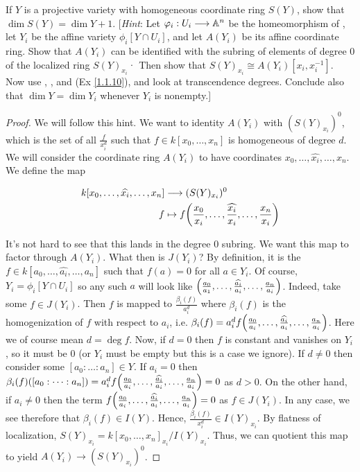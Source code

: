 \label{1.2.6}

If $Y$ is a projective variety with homogeneous coordinate ring $S(Y)$, show that
$\dim S(Y) = \dim Y + 1$. [\textit{Hint}: Let $\varphi_i: U_i \longrightarrow \mathbb A^n$ be the homeomorphism of \cite[2.2]{hartshorne},
let $Y_i$ be the affine variety $\phi_i[Y \cap U_i]$, and let $A(Y_i)$ be its affine coordinate ring. Show that $A(Y_i)$ can be identified with the subring of elements of degree $0$ of the
localized ring $S(Y)_{x_i}$· Then show that $S(Y)_{x_i} \cong A(Y_i)[x_i, x_i^{-1}]$. Now use \cite[1.7]{hartshorne},
\cite[1.8A]{hartshorne}, and (Ex \ref{1.1.10}), and look at transcendence degrees. Conclude also that $\dim Y = \dim Y_i$ whenever $Y_i$ is nonempty.]

\begin{proof}
    We will follow this hint. We want to identity $A(Y_i)$ with $(S(Y)_{x_i})^0$, which is the set of all $\frac{f}{x_i^d}$ such that $f \in k[x_0, \dots, x_n]$ is homogeneous of degree $d$. We will consider the coordinate ring $A(Y_i)$ to have coordinates $x_0, \dots, \widehat{x_i}, \dots, x_n$. We define the map

    \begin{align*}
        k[x_0, \dots, \widehat{x_i}, \dots, x_n] &\longrightarrow (S(Y)_{x_i})^0\\
        f &\mapsto f{\left(\frac{x_0}{x_i}, \dots, \widehat{\frac{x_i}{x_i}}, \dots, \frac{x_n}{x_i}\right)}
    \end{align*}

    It's not hard to see that this lands in the degree $0$ subring. We want this map to factor through $A(Y_i)$. What then is $J(Y_i)$? By definition, it is the $f \in k[a_0, \dots, \widehat{a_i}, \dots, a_n]$ such that $f(a) = 0$ for all $a \in Y_i$. Of course, $Y_i = \phi_i[Y \cap U_i]$ so any such $a$ will look like ${\left(\frac{a_0}{a_1}, \dots, \widehat{\frac{a_i}{a_i}}, \dots, \frac{a_n}{a_i}\right)}$. Indeed, take some $f \in J(Y_i)$. Then $f$ is mapped to $\frac{\beta_i(f)}{a_i^d}$ where $\beta_i(f)$ is the homogenization of $f$ with respect to $a_i$, i.e. $\beta_i(f) = a_i^d f{\left(\frac{a_0}{a_i}, \dots, \widehat{\frac{a_i}{a_i}}, \dots, \frac{a_n}{a_i}\right)}$. Here  we of course mean $d = \deg f$. Now, if $d = 0$ then $f$ is constant and vanishes on $Y_i$, so it must be $0$ (or $Y_i$ must be empty but this is a case we ignore). If $d \neq 0$ then consider some $[a_0 : \dots : a_n] \in Y$. If $a_i = 0$ then $\beta_i(f)([a_0 : \dots : a_n]) = a_i^d f{\left(\frac{a_0}{a_i}, \dots, \widehat{\frac{a_i}{a_i}}, \dots, \frac{a_n}{a_i}\right)} = 0$ as $d > 0$. On the other hand, if $a_i \neq 0$ then the term $f{\left(\frac{a_0}{a_i}, \dots, \widehat{\frac{a_i}{a_i}}, \dots, \frac{a_n}{a_i}\right)} = 0$ as $f \in J(Y_i)$. In any case, we see therefore that $\beta_i(f) \in I(Y)$. Hence, $\frac{\beta_i(f)}{x_i^d} \in I(Y)_{x_i}$. By flatness of localization, $S(Y)_{x_i} = k[x_0, \dots, x_n]_{x_i} / I(Y)_{x_i}$. Thus, we can quotient this map to yield $A(Y_i) \longrightarrow (S(Y)_{x_i})^0$. 


\end{proof}
